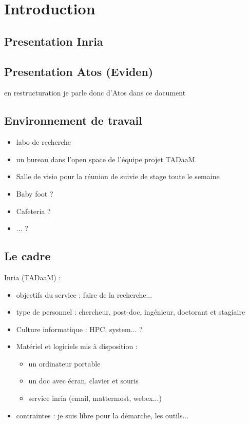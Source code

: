 \section{Introduction}

\subsection{Presentation Inria}


\subsection{Presentation Atos (Eviden)}

en restructuration je parle donc d'Atos dans ce document

\subsection{Environnement de travail}

\begin{itemize}
  \item labo de recherche
  \item un bureau dans l'open space de l'équipe projet TADaaM.
  \item Salle de visio pour la réunion de suivie de stage toute le semaine
  \item Baby foot ?
  \item Cafeteria ?
  \item ... ?
\end{itemize}

\subsection{Le cadre}

Inria (TADaaM) :
\begin{itemize}
  \item objectifs du service : faire de la recherche...
  \item type de personnel : chercheur, post-doc, ingénieur, doctorant et stagiaire
  \item Culture informatique : HPC, system... ?
  \item Matériel et logiciels mis à disposition :
  \begin{itemize}
    \item un ordinateur portable
    \item un doc avec écran, clavier et souris
    \item service inria (email, mattermost, webex...)
  \end{itemize}
  \item contraintes : je suis libre pour la démarche, les outils...
\end{itemize}

